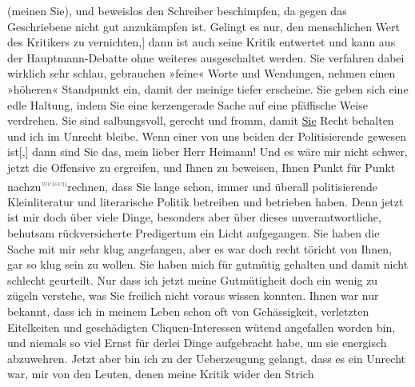 \begin{ledgroupsized}[t]{13cm}
               (meinen Sie), und beweislos den Schreiber beschimpfen, da gegen das Geschriebene
               nicht gut anzukämpfen ist. Gelingt es nur, den menschlichen Wert des Kritikers zu
                  vernichten\strikeout{n}{[},{]} dann ist auch seine Kritik entwertet und kann aus der Hauptmann-Debatte ohne weiteres ausgeschaltet
               werden.\pend
           \pstart
           Sie verfahren dabei wirklich sehr schlau, gebrauchen »feine« Worte und Wendungen,
               nehmen einen »höheren« Standpunkt ein, damit der meinige tiefer erscheine. Sie geben
               sich eine edle Haltung, indem Sie eine kerzengerade Sache auf eine pfäffische Weise
               verdrehen. Sie sind salbungsvoll, gerecht und fromm, damit \uline{Sie} Recht behalten und ich im Unrecht bleibe.\pend
           \pstart
           Wenn einer von uns beiden der Politisierende gewesen ist{[},{]} dann
               sind Sie das, mein lieber Herr Heimann! Und es
               wäre mir nicht schwer, jetzt die Offensive zu ergreifen, und Ihnen zu beweisen, Ihnen
               Punkt für Punkt nachzu\substVorne{}\textsuperscript{\textcolor{gray}{weisen}}{\allowbreak}\substDazwischen{}rechnen\substHinten{}, dass Sie lange schon, immer und überall politisierende Kleinliteratur und
               literarische Politik betreiben und betrieben haben. Denn jetzt ist mir doch über
               viele Dinge, besonders aber über dieses unverantwortliche, behutsam rückversicherte
               Predigertum ein Licht aufgegangen.\pend
           \pstart
           Sie haben die Sache mit mir sehr klug angefangen, aber es war doch recht töricht von
               Ihnen, gar so klug sein zu wollen. Sie haben mich für gutmütig gehalten und damit
               nicht schlecht ge{\pb}urteilt. Nur
               dass ich jetzt meine Gutmütigheit doch ein wenig zu zügeln verstehe, was Sie freilich
               nicht voraus wissen konnten. Ihnen war nur bekannt, dass ich in meinem Leben schon
               oft von Gehässigkeit, verletzten Eitelkeiten und geschädigten Cliquen-Interessen
               wütend angefallen worden bin, und niemals so viel Ernst für derlei Dinge aufgebracht
               habe, um sie energisch abzuwehren. Jetzt aber bin ich zu der Ueberzeugung gelangt,
               dass es ein Unrecht war, mir von den Leuten, denen meine Kritik wider den Strich

\end{ledgroupsized}
